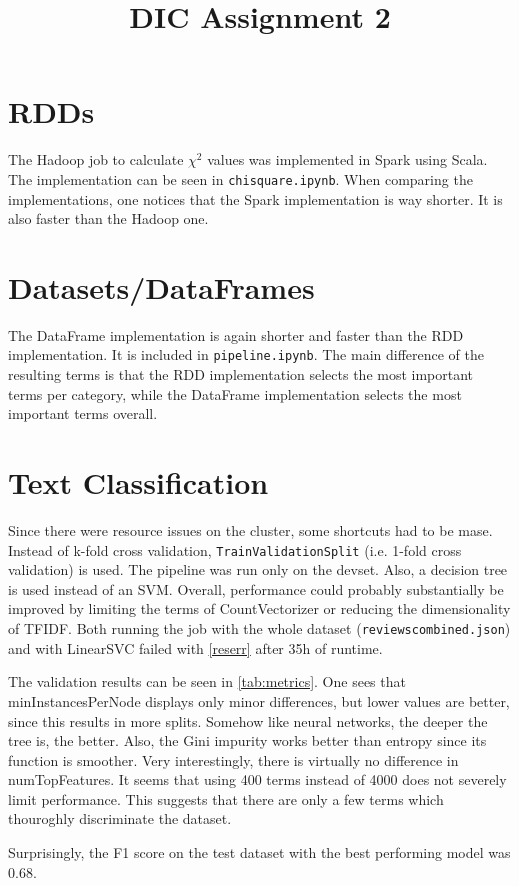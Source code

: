 \documentclass[11pt]{article}
\title{DIC Assignment 2}
\author{}
\begin{document}
\section{RDDs}

The Hadoop job to calculate $\chi^2$ values was implemented in Spark using Scala. The implementation can be seen in \texttt{chisquare.ipynb}. When comparing the implementations, one notices that the Spark implementation is way shorter. It is also faster than the Hadoop one.

\section{Datasets/DataFrames}

The DataFrame implementation is again shorter and faster than the RDD implementation. It is included in \texttt{pipeline.ipynb}. The main difference of the resulting terms is that the RDD implementation selects the most important terms per category, while the DataFrame implementation selects the most important terms overall.

\section{Text Classification}

Since there were resource issues on the cluster, some shortcuts had to be mase. Instead of k-fold cross validation, \texttt{TrainValidationSplit} (i.e. 1-fold cross validation) is used. The pipeline was run only on the devset. Also, a decision tree is used instead of an SVM. Overall, performance could probably substantially be improved by limiting the terms of CountVectorizer or reducing the dimensionality of TFIDF. Both running the job with the whole dataset (\texttt{reviewscombined.json}) and with LinearSVC failed with \autoref{reserr} after 35h of runtime.

The validation results can be seen in \autoref{tab:metrics}.  One sees that minInstancesPerNode displays only minor differences, but lower values are better, since this results in more splits. Somehow like neural networks, the deeper the tree is, the better. Also, the Gini impurity works better than entropy since its function is smoother. Very interestingly, there is virtually no difference in numTopFeatures. It seems that using 400 terms instead of 4000 does not severely limit performance. This suggests that there are only a few terms which thouroghly discriminate the dataset.

Surprisingly, the F1 score on the test dataset with the best performing model was 0.68.
\end{document}
